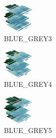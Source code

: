 \hspace{0.1cm}
\begin{minipage}[b]{0.15\linewidth}
\begin{figure}[H]                                                          
  \centering                                                             
  \begin{adjustbox}{width=1.5cm,center}                                   
  \includegraphics[width=1.5cm]{src/colorspace_colourflow/flows/colourflow_169-45.png}%
  \end{adjustbox}                                                        
\caption*{BLUE\_GREY3}                                           
\end{figure}                                                               
\end{minipage}
\hspace{0.1cm}
\begin{minipage}[b]{0.15\linewidth}
\begin{figure}[H]                                                          
  \centering                                                             
  \begin{adjustbox}{width=1.5cm,center}                                   
  \includegraphics[width=1.5cm]{src/colorspace_colourflow/flows/colourflow_170-45.png}%
  \end{adjustbox}                                                        
\caption*{BLUE\_GREY4}                                           
\end{figure}                                                               
\end{minipage}
\hspace{0.1cm}
\begin{minipage}[b]{0.15\linewidth}
\begin{figure}[H]                                                          
  \centering                                                             
  \begin{adjustbox}{width=1.5cm,center}                                   
  \includegraphics[width=1.5cm]{src/colorspace_colourflow/flows/colourflow_171-45.png}%
  \end{adjustbox}                                                        
\caption*{BLUE\_GREY5}                                           
\end{figure}                                                               
\end{minipage}
